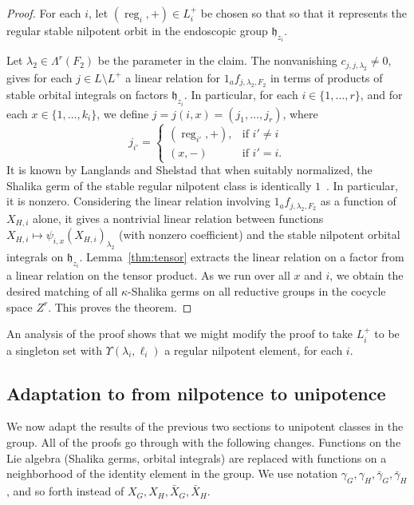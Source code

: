 \documentclass[12pt]{amsart}
\newcommand{\op}[1]{\operatorname{#1}}
\def\Y{\Upsilon}
\newcommand{\fh}{\mathfrak{h}}
\theoremstyle{plain}
\theoremstyle{definition}
\begin{document}
\begin{proof}
For each $i$, let $(\op{reg}_i,+)\in L^+_i$ be chosen so that so that
it represents the regular stable nilpotent orbit in the endoscopic
group $\fh_{z_i}$.

Let $\lambda_2\in \Lambda^r(F_2)$ be the parameter in the claim.  The
nonvanishing $c_{j,j,\lambda_2}\ne 0$, gives for each $j\in L\setminus L^+$ a linear relation for
$1_af_{j,\lambda_2,F_2}$ in terms of products of stable orbital integrals on
factors $\fh_{z_i}$.  In particular, for each $i\in\{1,\ldots,r\}$, and for each $x\in\{1,\ldots,k_i\}$,
we define
$j = j(i,x) = (j_1,\ldots,j_r)$, where 
\[
j_{i'} = \begin{cases} (\op{reg}_{i'},+), &\text{if } i'\ne i\\
       (x,-) & \text{if } i' = i.
  \end{cases}
\]
It is known by Langlands and Shelstad that when suitably normalized,
the Shalika germ of the stable regular nilpotent class is identically
$1$~\cite{LSxf}.  In particular, it is nonzero.  Considering the linear relation
involving $1_af_{j,\lambda_2,F_2}$ as a function of $X_{H,i}$ alone,
it gives a nontrivial linear relation between functions
$X_{H,i}\mapsto\psi_{i,x}(X_{H,i})_{\lambda_2}$ (with nonzero
coefficient) and the stable nilpotent orbital integrals on
$\fh_{z_i}$.  Lemma~\ref{thm:tensor} extracts the linear relation on
a factor from a linear relation on the tensor product.  As we run over
all $x$ and $i$, we obtain the desired matching of all
$\kappa$-Shalika germs on all reductive groups in the cocycle space
$Z^r$.  This proves the theorem.
\end{proof}


An analysis of the proof shows that we might modify the proof to take
$L^+_i$ to be a singleton set with $\Y(\lambda_i,\ell_i)$
a regular nilpotent element, for each $i$.

\subsection{Adaptation to from nilpotence to unipotence}

We now adapt the results of the previous two sections to unipotent
classes in the group. All of the proofs go through with the following
changes.  Functions on the Lie algebra (Shalika germs, orbital
integrals) are replaced with functions on a neighborhood of the
identity element in the group.  We use notation
$\gamma_G,\gamma_H,\bar \gamma_G,\bar \gamma_H$, and so forth instead
of $X_G,X_H,\bar X_G,\bar X_H$.
\end{document}

